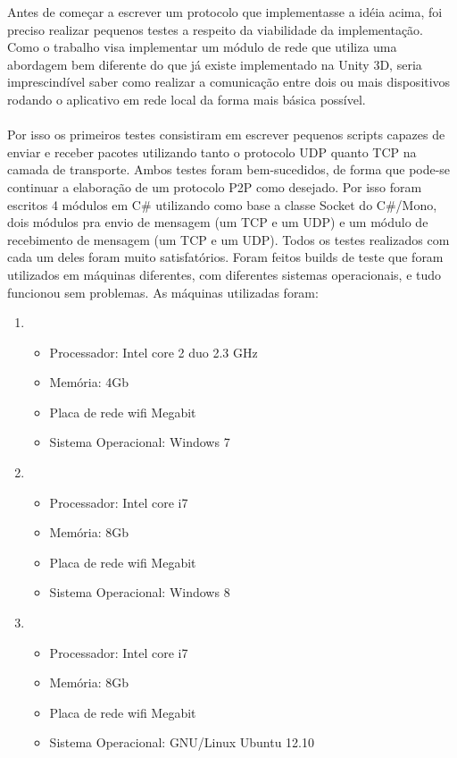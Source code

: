 \documentclass{article}
\begin{document}
Antes de começar a escrever um protocolo que implementasse a idéia acima, 
foi preciso realizar pequenos testes a respeito da viabilidade da implementação.
Como o trabalho visa implementar um módulo de rede que utiliza uma abordagem
bem diferente do que já existe implementado na Unity 3D, seria imprescindível saber como
realizar a comunicação entre dois ou mais dispositivos rodando o aplicativo em rede local da 
forma mais básica possível. 
\\\\
Por isso os primeiros testes consistiram em escrever pequenos scripts capazes de enviar
e receber pacotes utilizando tanto o protocolo UDP quanto TCP na camada de transporte.
Ambos testes foram bem-sucedidos, de forma que pode-se continuar a elaboração de um
protocolo P2P como desejado. Por isso foram escritos 4 módulos em C\# utilizando como 
base a classe Socket do C\#/Mono, dois módulos pra envio de mensagem (um TCP e um UDP)
e um módulo de recebimento de mensagem (um TCP e um UDP). Todos os testes realizados com
cada um deles foram muito satisfatórios. Foram feitos builds de teste que 
foram utilizados em máquinas diferentes, com diferentes sistemas operacionais, e tudo funcionou sem
problemas. As máquinas utilizadas foram:

\begin{enumerate}
\item 
\begin{itemize}
\item Processador: Intel core 2 duo 2.3 GHz
\item Memória: 4Gb
\item Placa de rede wifi Megabit
\item Sistema Operacional: Windows 7
\end{itemize}
\item 
\begin{itemize}
\item Processador: Intel core i7
\item Memória: 8Gb
\item Placa de rede wifi Megabit
\item Sistema Operacional: Windows 8
\end{itemize}
\item 
\begin{itemize}
\item Processador: Intel core i7
\item Memória: 8Gb
\item Placa de rede wifi Megabit
\item Sistema Operacional: GNU/Linux Ubuntu 12.10
\end{itemize}
\end{enumerate}
\end{document}

